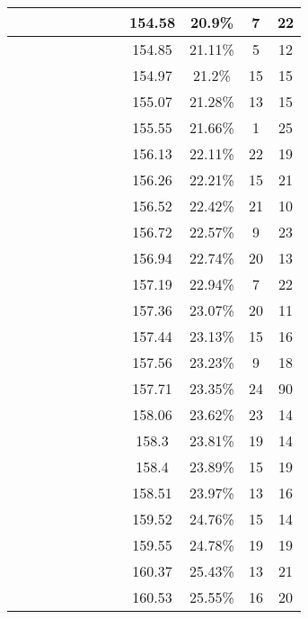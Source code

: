 \begin{center}
\begin{longtable}{|c|c|c|c|c|c|c|c|c|c|c|c|}
 \x &  &  &  &  \x &  &  \x &  & 154.58 & 20.9\% & 7 & 22 \\ \hline
 \x &  \x &  &  &  &  \x &  \x &  & 154.85 & 21.11\% & 5 & 12 \\ \hline
 \x &  \x &  &  \x &  &  &  \x &  & 154.97 & 21.2\% & 15 & 15 \\ \hline
 \x &  \x &  &  \x &  \x &  &  \x &  \x & 155.07 & 21.28\% & 13 & 15 \\ \hline
 \x &  \x &  &  \x &  &  &  \x &  \x & 155.55 & 21.66\% & 1 & 25 \\ \hline
 \x &  &  &  &  \x &  &  \x &  \x & 156.13 & 22.11\% & 22 & 19 \\ \hline
 \x &  \x &  \x &  \x &  \x &  &  &  & 156.26 & 22.21\% & 15 & 21 \\ \hline
 \x &  &  \x &  \x &  &  &  \x &  \x & 156.52 & 22.42\% & 21 & 10 \\ \hline
 \x &  &  \x &  \x &  \x &  &  \x &  & 156.72 & 22.57\% & 9 & 23 \\ \hline
 \x &  \x &  &  \x &  \x &  &  &  & 156.94 & 22.74\% & 20 & 13 \\ \hline
 \x &  &  \x &  &  &  \x &  \x &  & 157.19 & 22.94\% & 7 & 22 \\ \hline
 \x &  &  &  &  &  &  \x &  \x & 157.36 & 23.07\% & 20 & 11 \\ \hline
 \x &  &  \x &  \x &  \x &  &  &  \x & 157.44 & 23.13\% & 15 & 16 \\ \hline
 \x &  \x &  &  &  \x &  &  \x &  \x & 157.56 & 23.23\% & 9 & 18 \\ \hline
 \x &  \x &  \x &  &  &  &  \x &  & 157.71 & 23.35\% & 24 & 90 \\ \hline
 \x &  &  &  \x &  \x &  &  \x &  & 158.06 & 23.62\% & 23 & 14 \\ \hline
 \x &  \x &  &  \x &  &  &  &  & 158.3 & 23.81\% & 19 & 14 \\ \hline
 \x &  &  &  \x &  &  &  \x &  \x & 158.4 & 23.89\% & 15 & 19 \\ \hline
 \x &  &  &  &  &  \x &  \x &  & 158.51 & 23.97\% & 13 & 16 \\ \hline
 \x &  \x &  \x &  \x &  \x &  &  \x &  \x & 159.52 & 24.76\% & 15 & 14 \\ \hline
 \x &  &  \x &  \x &  &  &  \x &  & 159.55 & 24.78\% & 19 & 19 \\ \hline
 \x &  &  \x &  \x &  \x &  &  \x &  \x & 160.37 & 25.43\% & 13 & 21 \\ \hline
 \x &  \x &  &  \x &  \x &  \x &  &  \x & 160.53 & 25.55\% & 16 & 20 \\ \hline

\end{longtable}
\end{center}
